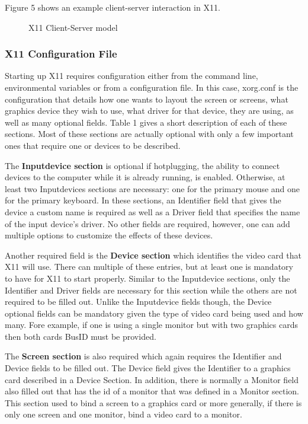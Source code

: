 \documentclass{acm_proc_article-sp}
\begin{document}
Figure 5 shows an example client-server interaction in X11. 
 \begin{figure}[h]
 \centering
 \caption{X11 Client-Server model}
 \end{figure}

\subsubsection{X11 Configuration File}
Starting up X11 requires configuration either from the command line, environmental variables or from a configuration file. In this case, xorg.conf is the configuration that details how one wants to layout the screen or screens, what graphics device they wish to use, what driver for that device, they are using, as well as many optional fields. Table 1 gives a short description of each of these sections. Most of these sections are actually optional with only a few important ones that require one or devices to be described.\cite{config} 
\par
The \textbf{Inputdevice section} is optional if hotplugging, the ability to connect devices to the computer while it is already running, is enabled.\cite{config}  Otherwise, at least two Inputdevices sections are necessary: one for the primary mouse and one for the primary keyboard. In these sections, an Identifier field that gives the device a custom name is required as well as a Driver field that specifies the name of the input device's driver. No other fields are required, however, one can add multiple options to customize the effects of these devices.
\par
Another required field is the \textbf{Device section} which identifies the video card that X11 will use. There can multiple of these entries, but at least one is mandatory to have for X11 to start properly. Similar to the Inputdevice sections, only the Identifier and Driver fields are necessary for this section while the others are not required to be filled out. Unlike the Inputdevice fields though, the Device optional fields can be mandatory given the type of video card being used and how many. Fore example, if one is using a single monitor but with two graphics cards then both cards BusID must be provided.\cite{config}
\par
The \textbf{Screen section} is also required which again requires the Identifier and Device fields to be filled out. The Device field gives the Identifier to a graphics card described in a Device Section. In addition, there is normally a Monitor field also filled out that has the id of a monitor that was defined in a Monitor section. This section used to bind a screen to a graphics card or more generally, if there is only one screen and one monitor, bind a video card to a monitor.\cite{config}
\end{document}
